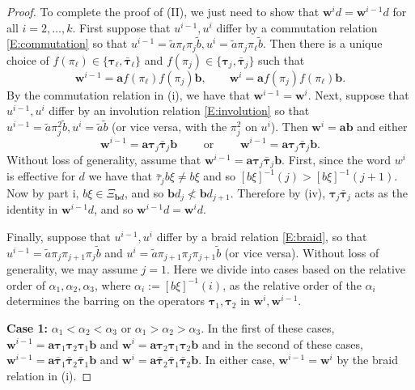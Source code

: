 \documentclass[11pt]{article}
\newcommand{\al}{\alpha}
\newcommand{\bw}{\mathbf{w}}
\newcommand{\ba}{\mathbf{a}}
\newcommand{\bb}{\mathbf{b}}
\theoremstyle{definition} %
\theoremstyle{remark} %
\newcommand{\btau}{{\boldsymbol \tau}}
\newcommand{\bbtau}{\bar {\boldsymbol \tau}}
\begin{document}
\begin{proof}
	
	To complete the proof of (II), we just need to show that $\mathbf w^{i} d = \mathbf w^{i-1} d$ for all $i = 2, \dots, k$. First suppose that $u^{i-1}, u^i$ differ by a commutation relation \eqref{E:commutation} so that $u^{i-1} = \tilde a \pi_\ell \pi_j \tilde b, u^i = \tilde a \pi_j \pi_\ell \tilde b$. Then there is a unique choice of $f(\pi_\ell) \in \{\btau_\ell, \bbtau_\ell\}$ and $f(\pi_j) \in \{\btau_j, \bbtau_j\}$ such that
	$$
	\bw^{i-1} = \ba f(\pi_\ell) f(\pi_j) \bb, \qquad \bw^i = \ba f(\pi_j) f(\pi_\ell) \bb.
	$$
	By the commutation relation in (i), we have that $\bw^{i-1} = \bw^i$. Next, suppose that $u^{i-1}, u^i$ differ by an involution relation \eqref{E:involution} so that $u^{i-1} = \tilde a \pi_j^2 \tilde b, u^i = \tilde a \tilde b$ (or vice versa, with the $\pi_j^2$ on $u^i$). Then $\bw^i = \ba \bb$ and either
	$$
	\bw^{i-1} = \ba \btau_j \bbtau_j \bb \qquad \text{ or } \qquad \bw^{i-1} = \ba \btau_j \bbtau_j \bb.
	$$
	Without loss of generality, assume that $\bw^{i-1} = \ba \btau_j \bbtau_j \bb$. First, since the word $w^i$ is effective for $d$ we have that $\bar \tau_j b \xi \ne b \xi$ and so $[b \xi]^{-1}(j) > [b \xi]^{-1}(j + 1).$ Now by part i, $b \xi \in \Xi_{\bb d}$, and so $\bb d_j \not < \bb d_{j+1}$.
	Therefore by (iv), $\btau_j \bbtau_j$ acts as the identity in $\bw^{i-1} d$, and so $\bw^{i-1} d = \bw^i d$. 
	
	Finally, suppose that $u^{i-1}, u^i$ differ by a braid relation \eqref{E:braid}, so that $u^{i-1} = \tilde a \pi_j \pi_{j+1} \pi_j \tilde b$ and $u^{i} = \tilde a  \pi_{j+1} \pi_j \pi_{j+1} \tilde b$ (or vice versa). Without loss of generality, we may assume $j = 1$. 
	Here we divide into cases based on the relative order of $\al_1, \al_2, \al_3$, where $\al_i := [b \xi]^{-1}(i)$, as the relative order of the $\al_i$ determines the barring on the operators $\btau_1, \btau_{2}$ in $\bw^i, \bw^{i-1}$. 
	
	\textbf{Case 1:} $\al_1 < \al_2 < \al_3$ or $\al_1 > \al_2 > \al_3$. \qquad In the first of these cases, $\bw^{i-1} = \ba  \btau_{1} \btau_2\btau_1 \bb$ and $\bw^{i} = \ba  \btau_2 \btau_1\btau_2 \bb$ and in the second of these cases, $\bw^{i-1} = \ba \bbtau_1 \bbtau_2\bbtau_1 \bb$ and $\bw^{i} = \ba  \bbtau_2 \bbtau_1\bbtau_2 \bb$. In either case, $\bw^{i-1} = \bw^i$ by the braid relation in (i).
	

\end{proof}
\end{document}

